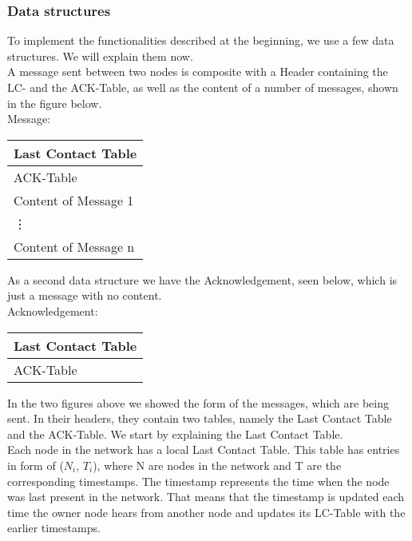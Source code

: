 	\subsubsection{Data structures}
	To implement the functionalities described at the beginning, we use a few data structures. We will explain them now. \\

	A message sent between two nodes is composite with a Header containing the LC- and the ACK-Table, as well as the content of a number of messages, shown in the figure below. \\

	Message:
		\begin{center}
			\begin{tabular}{ | l |}
				\hline
				Last Contact Table \\ \hline
				ACK-Table \\ \hline
				Content of Message 1\\ \hline
				\vdots\\ \hline
				Content of Message n\\ \hline
			\end{tabular}
		\end{center}


As a second data structure we have the Acknowledgement, seen below, which is just a message with no content. \\


	Acknowledgement:
		\begin{center}
			\begin{tabular}{ | l |}
				\hline
				Last Contact Table \\ \hline
				ACK-Table \\ \hline
			\end{tabular}
		\end{center}
			
In the two figures above we showed the form of the messages, which are being sent. In their headers, they contain two tables, namely the Last Contact Table and the ACK-Table. We start by explaining the Last Contact Table. \\

Each node in the network has a local Last Contact Table. This table has entries in form of ($N_{i}$, $T_{i}$), where N are nodes in the network and T are the corresponding timestamps. The timestamp represents the time when the node was last present in the network. That means that the timestamp is updated each time the owner node hears from another node and updates its LC-Table with the earlier timestamps. \\

